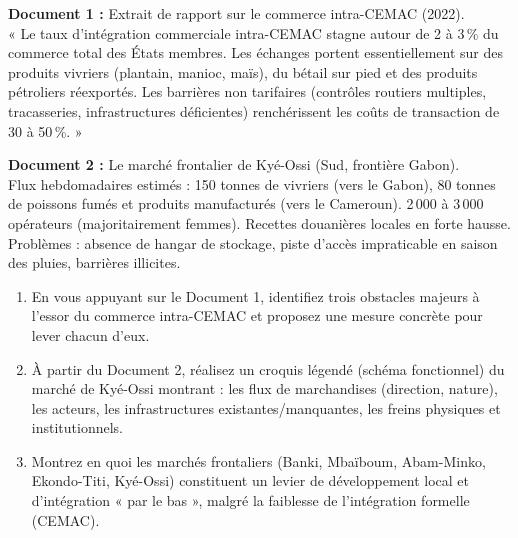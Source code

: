 \documentclass[11pt]{article}
\begin{document}
\begin{exercice}
\label{exo:cemac}
\textbf{Document 1 :} Extrait de rapport sur le commerce intra-CEMAC (2022).\\
« Le taux d'intégration commerciale intra-CEMAC stagne autour de 2 à 3\,\% du commerce total des États membres. Les échanges portent essentiellement sur des produits vivriers (plantain, manioc, maïs), du bétail sur pied et des produits pétroliers réexportés. Les barrières non tarifaires (contrôles routiers multiples, tracasseries, infrastructures déficientes) renchérissent les coûts de transaction de 30 à 50\,\%. »

\textbf{Document 2 :} Le marché frontalier de Kyé-Ossi (Sud, frontière Gabon).\\
Flux hebdomadaires estimés : 150 tonnes de vivriers (vers le Gabon), 80 tonnes de poissons fumés et produits manufacturés (vers le Cameroun). 2\,000 à 3\,000 opérateurs (majoritairement femmes). Recettes douanières locales en forte hausse. Problèmes : absence de hangar de stockage, piste d'accès impraticable en saison des pluies, barrières illicites.

\begin{enumerate}
    \item En vous appuyant sur le Document 1, identifiez trois obstacles majeurs à l'essor du commerce intra-CEMAC et proposez une mesure concrète pour lever chacun d'eux.
    \item À partir du Document 2, réalisez un croquis légendé (schéma fonctionnel) du marché de Kyé-Ossi montrant : les flux de marchandises (direction, nature), les acteurs, les infrastructures existantes/manquantes, les freins physiques et institutionnels.
    \item Montrez en quoi les marchés frontaliers (Banki, Mbaïboum, Abam-Minko, Ekondo-Titi, Kyé-Ossi) constituent un levier de développement local et d'intégration « par le bas », malgré la faiblesse de l'intégration formelle (CEMAC).
\end{enumerate}
\end{exercice}
\end{document}
